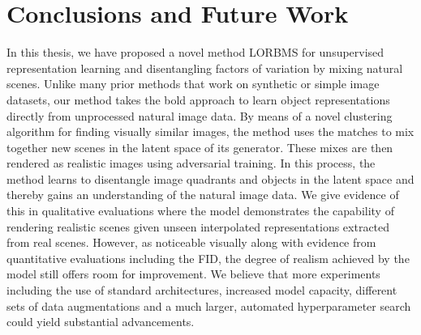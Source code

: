 \documentclass[a4paper,12pt]{report}
\begin{document}
\chapter{Conclusions and Future Work}\label{sec:conclusion}


In this thesis, we have proposed a novel method LORBMS for unsupervised representation learning and disentangling factors of variation by mixing natural scenes. Unlike many prior methods that work on synthetic or simple image datasets, our method takes the bold approach to learn object representations directly from unprocessed natural image data. By means of a novel clustering algorithm for finding visually similar images, the method uses the matches to mix together new scenes in the latent space of its generator. These mixes are then rendered as realistic images using adversarial training. In this process, the method learns to disentangle image quadrants and objects in the latent space and thereby gains an understanding of the natural image data. We give evidence of this in qualitative evaluations where the model demonstrates the capability of rendering realistic scenes given unseen interpolated representations extracted from real scenes. However, as noticeable visually along with evidence from quantitative evaluations including the FID, the degree of realism achieved by the model still offers room for improvement. We believe that more experiments including the use of standard architectures, increased model capacity, different sets of data augmentations and a much larger, automated hyperparameter search could yield substantial advancements. 
\end{document}
